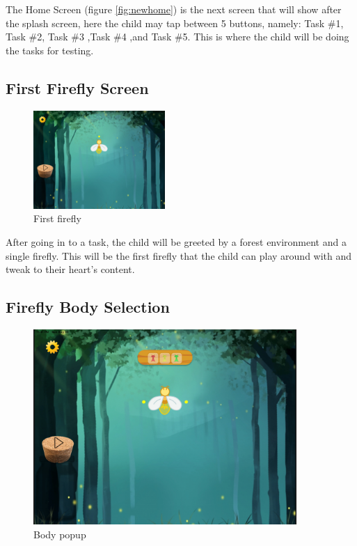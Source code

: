 The Home Screen (figure \ref{fig:newhome}) is the next screen that will show after the splash screen, here the child may tap between 5 buttons, namely: Task \#1, Task \#2, Task \#3 ,Task \#4 ,and Task \#5. This is where the child will be doing the tasks for testing.

\subsection{First Firefly Screen}

\begin{figure}[H]
    \centering
    \includegraphics[width=5cm]{figures/newScreenFlows/newfirstfirefly.png}
    \caption{First firefly}
    \label{fig:firstfly}
\end{figure}

After going in to a task, the child will be greeted by a forest environment and a single firefly.
This will be the first firefly that the child can play around with and tweak to their heart's content.

\subsection{Firefly Body Selection}

\begin{figure}[H]
    \centering
    \includegraphics[width=10cm]{figures/newScreenFlows/newbody.png}
    \caption{Body popup}
    \label{fig:newbody}
\end{figure}

